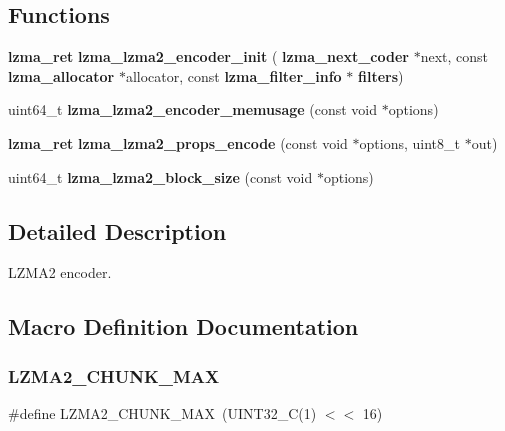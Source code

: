 \subsection*{Functions}
\begin{DoxyCompactItemize}
\item 
\mbox{\label{lzma2__encoder_8h_a7dd1146ceea09c352e705de30d14aace}} 
\textbf{ lzma\+\_\+ret} {\bfseries lzma\+\_\+lzma2\+\_\+encoder\+\_\+init} (\textbf{ lzma\+\_\+next\+\_\+coder} $\ast$next, const \textbf{ lzma\+\_\+allocator} $\ast$allocator, const \textbf{ lzma\+\_\+filter\+\_\+info} $\ast$\textbf{ filters})
\item 
\mbox{\label{lzma2__encoder_8h_afff5740f7004ed7d3c7b67c3671a30c0}} 
uint64\+\_\+t {\bfseries lzma\+\_\+lzma2\+\_\+encoder\+\_\+memusage} (const void $\ast$options)
\item 
\mbox{\label{lzma2__encoder_8h_aecbff0af1269d11accb87f956e2609d4}} 
\textbf{ lzma\+\_\+ret} {\bfseries lzma\+\_\+lzma2\+\_\+props\+\_\+encode} (const void $\ast$options, uint8\+\_\+t $\ast$out)
\item 
\mbox{\label{lzma2__encoder_8h_ae1c48f80b363367e094795c60f466624}} 
uint64\+\_\+t {\bfseries lzma\+\_\+lzma2\+\_\+block\+\_\+size} (const void $\ast$options)
\end{DoxyCompactItemize}


\subsection{Detailed Description}
L\+Z\+M\+A2 encoder. 



\subsection{Macro Definition Documentation}
\mbox{\label{lzma2__encoder_8h_a8d74c156d01559e0282d9af9c6279e03}} 
\subsubsection{L\+Z\+M\+A2\+\_\+\+C\+H\+U\+N\+K\+\_\+\+M\+AX}
{\footnotesize\ttfamily \#define L\+Z\+M\+A2\+\_\+\+C\+H\+U\+N\+K\+\_\+\+M\+AX~(U\+I\+N\+T32\+\_\+C(1) $<$$<$ 16)}



